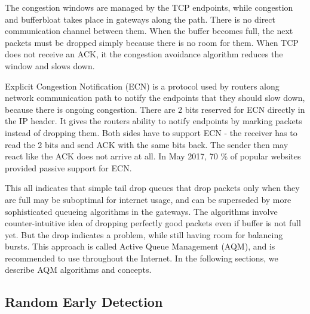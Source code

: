 The congestion windows are managed by the TCP endpoints, while congestion and bufferbloat takes place in gateways along the path. There is no direct communication channel between them. When the buffer becomes full, the next packets must be dropped simply because there is no room for them. When TCP does not receive an ACK, it the congestion avoidance algorithm reduces the window and slows down.

Explicit Congestion Notification (ECN) \cite{rfc3168:ECN} is a protocol used by routers along network communication path to notify the endpoints that they should slow down, because there is ongoing congestion. There are 2 bits reserved for ECN directly in the IP header. It gives the routers ability to notify endpoints by marking packets instead of dropping them. Both sides have to support ECN - the receiver has to read the 2 bits and send ACK with the same bits back. The sender then may react like the ACK does not arrive at all. In May 2017, 70 \% of popular websites provided passive support for ECN\cite{ECN:proceedings}.

This all indicates that simple tail drop queues that drop packets only when they are full may be suboptimal for internet usage, and can be superseded by more sophisticated queueing algorithms in the gateways. The algorithms involve counter-intuitive idea of dropping perfectly good packets even if buffer is not full yet. But the drop indicates a problem, while still having room for balancing bursts. This approach is called Active Queue Management (AQM), and is recommended to use throughout the Internet. In the following sections, we describe AQM algorithms and concepts.

\subsection{Random Early Detection}

